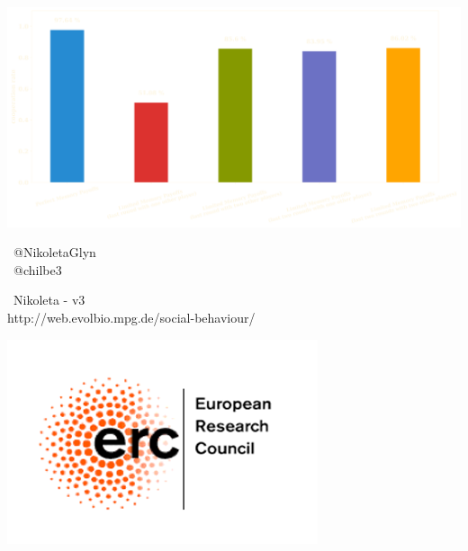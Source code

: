 \documentclass{beamer}
\begin{document}
\begin{frame}
    \centering
    
\end{frame}

\begin{frame}
    \centering
    \includegraphics[width=\textwidth]{static/results_five.png}
\end{frame}

\begin{frame}
    \begin{center}
    \faTwitter \ @NikoletaGlyn \\
    \faTwitter \ @chilbe3 \\
    \vspace{1cm}

    \faGithub \ Nikoleta - v3 \\
    http://web.evolbio.mpg.de/social-behaviour/ \\
    \vspace{1cm}

    \includegraphics[width=.3\textwidth]{static/erc.png}
    \end{center}
\end{frame}
\end{document}
